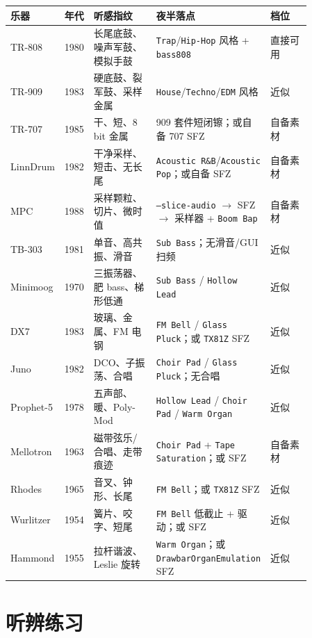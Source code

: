 \begin{longtable}{p{0.13\linewidth}p{0.08\linewidth}p{0.22\linewidth}p{0.28\linewidth}p{0.15\linewidth}}
\hline
乐器 & 年代 & 听感指纹 & 夜半落点 & 档位 \\
\hline
\endhead
TR-808 & 1980 & 长尾底鼓、噪声军鼓、模拟手鼓 & \texttt{Trap}/\texttt{Hip-Hop} 风格 + \texttt{bass808} & 直接可用 \\
TR-909 & 1983 & 硬底鼓、裂军鼓、采样金属 & \texttt{House}/\texttt{Techno}/\texttt{EDM} 风格 & 近似 \\
TR-707 & 1985 & 干、短、8 bit 金属 & 909 套件短闭镲；或自备 707 SFZ & 自备素材 \\
LinnDrum & 1982 & 干净采样、短击、无长尾 & \texttt{Acoustic R\&B}/\texttt{Acoustic Pop}；或自备 SFZ & 自备素材 \\
MPC & 1988 & 采样颗粒、切片、微时值 & \texttt{--slice-audio} $\to$ SFZ $\to$ 采样器 + \texttt{Boom Bap} & 自备素材 \\
TB-303 & 1981 & 单音、高共振、滑音 & \texttt{Sub Bass}；无滑音/GUI 扫频 & 近似 \\
Minimoog & 1970 & 三振荡器、肥 bass、梯形低通 & \texttt{Sub Bass} / \texttt{Hollow Lead} & 近似 \\
DX7 & 1983 & 玻璃、金属、FM 电钢 & \texttt{FM Bell} / \texttt{Glass Pluck}；或 \texttt{TX81Z} SFZ & 近似 \\
Juno & 1982 & DCO、子振荡、合唱 & \texttt{Choir Pad} / \texttt{Glass Pluck}；无合唱 & 近似 \\
Prophet-5 & 1978 & 五声部、暖、Poly-Mod & \texttt{Hollow Lead} / \texttt{Choir Pad} / \texttt{Warm Organ} & 近似 \\
Mellotron & 1963 & 磁带弦乐/合唱、走带痕迹 & \texttt{Choir Pad} + \texttt{Tape Saturation}；或 SFZ & 自备素材 \\
Rhodes & 1965 & 音叉、钟形、长尾 & \texttt{FM Bell}；或 \texttt{TX81Z} SFZ & 近似 \\
Wurlitzer & 1954 & 簧片、咬字、短尾 & \texttt{FM Bell} 低截止 + 驱动；或 SFZ & 近似 \\
Hammond & 1955 & 拉杆谐波、Leslie 旋转 & \texttt{Warm Organ}；或 \texttt{DrawbarOrganEmulation} SFZ & 近似 \\
\hline
\end{longtable}

\section{听辨练习}
\label{sec:iconic-exercises}



